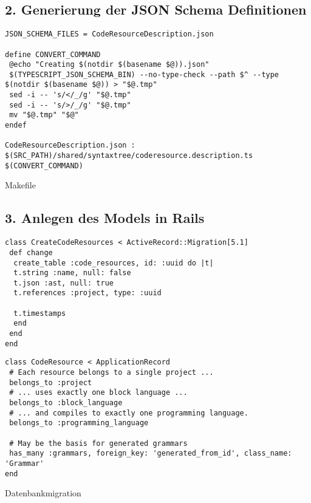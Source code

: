\subsection{2. Generierung der JSON Schema Definitionen}
\begin{lstlisting}
JSON_SCHEMA_FILES = CodeResourceDescription.json

define CONVERT_COMMAND
 @echo "Creating $(notdir $(basename $@)).json"
 $(TYPESCRIPT_JSON_SCHEMA_BIN) --no-type-check --path $^ --type $(notdir $(basename $@)) > "$@.tmp"
 sed -i -- 's/</_/g' "$@.tmp"
 sed -i -- 's/>/_/g' "$@.tmp"
 mv "$@.tmp" "$@"
endef

CodeResourceDescription.json : $(SRC_PATH)/shared/syntaxtree/coderesource.description.ts
$(CONVERT_COMMAND)
\end{lstlisting}

Makefile
\subsection{3. Anlegen des Models in Rails}

\begin{lstlisting}
class CreateCodeResources < ActiveRecord::Migration[5.1]
 def change
  create_table :code_resources, id: :uuid do |t|
  t.string :name, null: false
  t.json :ast, null: true
  t.references :project, type: :uuid

  t.timestamps
  end
 end
end
\end{lstlisting}

\begin{lstlisting}
class CodeResource < ApplicationRecord
 # Each resource belongs to a single project ...
 belongs_to :project
 # ... uses exactly one block language ...
 belongs_to :block_language
 # ... and compiles to exactly one programming language.
 belongs_to :programming_language

 # May be the basis for generated grammars
 has_many :grammars, foreign_key: 'generated_from_id', class_name: 'Grammar'
end
\end{lstlisting}
Datenbankmigration
